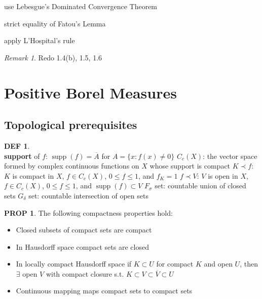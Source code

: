 \documentclass[hidelinks,10pt]{article}
\theoremstyle{definition}
\newtheorem*{defin}{DEF}
\theoremstyle{dotles}
\newenvironment{exercise}[1]
  {\renewcommand\theinnercustomex{#1}\innercustomex}
  {\endinnercustomex}
\theoremstyle{dotless}
\newtheorem{proposition}{PROP}[section]
\theoremstyle{remark}
\newtheorem*{remark}{Remark}
\DeclareMathOperator\supp{supp}
\begin{document}
\begin{exercise}{1.7}
use Lebesgue's Dominated Convergence Theorem
\end{exercise}

\begin{exercise}{1.8}
strict equality of Fatou's Lemma
\end{exercise}

\begin{exercise}{1.9}
apply L'Hospital's rule
\end{exercise}

\begin{remark}
Redo 1.4(b), 1.5, 1.6
\end{remark}

\newpage

\section{Positive Borel Measures}

\subsection{Topological prerequisites}

\begin{defin}~\\
\textbf{support} of $f$: $\supp(f)=\overline{A}$ for $A=\{x:f(x)\neq0\}$\newline
$C_c(X)$: the vector space formed by complex continuous functions on $X$ whose support is compact\bigbreak
$K\prec f$: $K$ is compact in $X$, $f\in C_c(X)$, $0\leq f\leq1$, and $f_K=1$\newline
$f\prec V$: $V$ is open in $X$, $f\in C_c(X)$, $0\leq f\leq1$, and $\supp(f)\subset V$\bigbreak
$F_\sigma$ set: countable union of closed sets\newline
$G_\delta$ set: countable intersection of open sets
\end{defin}

\begin{proposition}The following compactness properties hold:
\begin{itemize}
    \item Closed subsets of compact sets are compact
    \item In Hausdorff space compact sets are closed
    \item In locally compact Hausdorff space if $K\subset U$ for compact $K$ and open $U$, then $\exists$ open $V$ with compact closure s.t. $K\subset V\subset\overline{V}\subset U$
    \item Continuous mapping maps compact sets to compact sets
\end{itemize}
\end{proposition}
\end{document}
